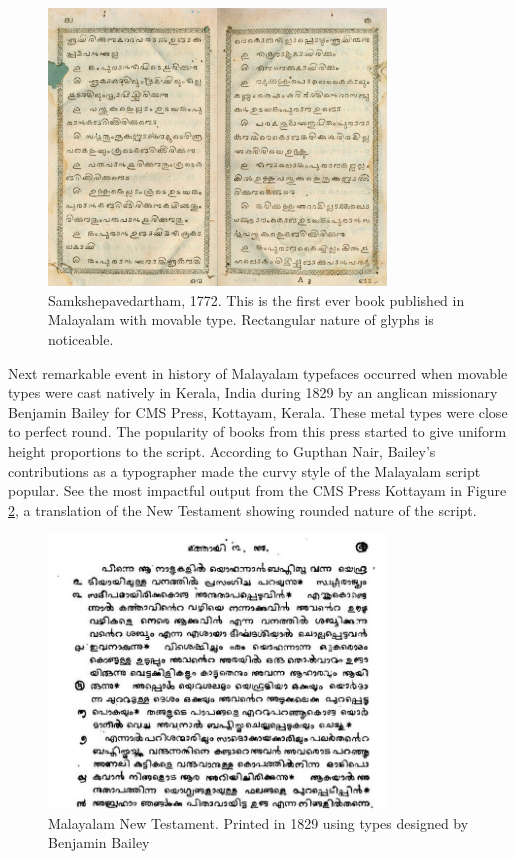 \documentclass[11pt,twoside,a4paper,parskip=half]{scrartcl}
\begin{document}
\begin{figure}[h!]
	\includegraphics[width=0.8\textwidth]{images/samkshepavedartham1772.png}
	\caption{Samkshepavedartham, 1772. This is the first ever book published in Malayalam with movable type. Rectangular nature of glyphs is noticeable.}
	\label{Samkshepam}
\end{figure} 

Next remarkable event in history of Malayalam typefaces occurred when movable types were cast natively in Kerala, India during 1829 by an anglican missionary Benjamin Bailey\cite{babucherian} for CMS Press, Kottayam, Kerala. These metal types were close to perfect round. The popularity of books from this press started to give uniform height proportions to the script. According to Gupthan Nair, Bailey's contributions as a typographer made the curvy style of the Malayalam script popular\cite{gupthannair}. See the most impactful output from the CMS Press Kottayam in Figure \ref{newtestament}, a translation of the New Testament showing rounded nature of the script.


\begin{figure}[h!]
	\includegraphics[width=0.8\textwidth]{images/newtestament1829.png}
	\caption{Malayalam New Testament. Printed in 1829 using types designed by Benjamin Bailey }
	\label{newtestament}
\end{figure}
\end{document}
